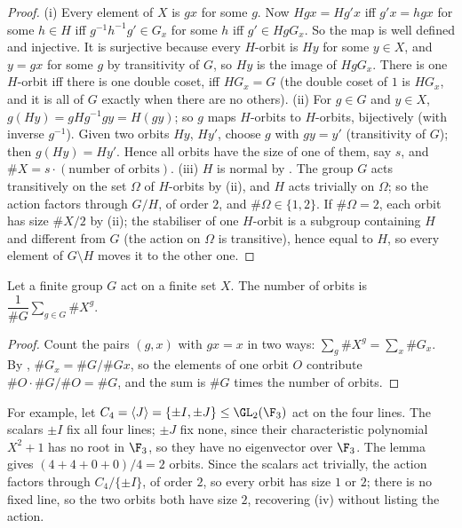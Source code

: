 \begin{proof}
(i) Every element of $X$ is $gx$ for some $g$. Now $Hgx=Hg'x$ iff $g'x=hgx$ for some $h\in H$ iff $g^{-1}h^{-1}g'\in G_x$ for some $h$ iff $g'\in HgG_x$. So the
map is well defined and injective. It is surjective because every $H$-orbit is $Hy$ for some $y\in X$, and $y=gx$ for some $g$ by transitivity of $G$,
so $Hy$ is the image of $HgG_x$. There is one $H$-orbit iff there is one double coset, iff $HG_x=G$ (the double coset of $1$ is $HG_x$, and it is all
of $G$ exactly when there are no others).
(ii) For $g\in G$ and $y\in X$, $g(Hy)=gHg^{-1}gy=H(gy)$; so $g$ maps $H$-orbits to $H$-orbits, bijectively (with inverse $g^{-1}$). Given two orbits
$Hy$, $Hy'$, choose $g$ with $gy=y'$ (transitivity of $G$); then $g(Hy)=Hy'$. Hence all orbits have the size of one of them, say $s$, and
$\#X=s\cdot(\text{number of orbits})$. (iii) $H$ is normal by . The group $G$ acts transitively on the set $\Omega$ of $H$-orbits by (ii),
and $H$ acts trivially on $\Omega$; so the action factors through $G/H$, of order $2$, and $\#\Omega\in\{1,2\}$. If $\#\Omega=2$, each orbit has size $\#X/2$ by
(ii); the stabiliser of one $H$-orbit is a subgroup containing $H$ and different from $G$ (the action on $\Omega$ is transitive), hence equal to $H$, so every
element of $G\setminus H$ moves it to the other one.
\end{proof}

\begin{lemma}\label{lem:groups:burnside}
Let a finite group $G$ act on a finite set $X$. The number of orbits is $\dfrac1{\#G}\displaystyle\sum_{g\in G}\#X^g$.
\end{lemma}

\begin{proof}
Count the pairs $(g,x)$ with $gx=x$ in two ways: $\sum_g\#X^g=\sum_x\#G_x$. By , $\#G_x=\#G/\#Gx$, so the elements of one
orbit $O$ contribute $\#O\cdot\#G/\#O=\#G$, and the sum is $\#G$ times the number of orbits.
\end{proof}

For example, let $C_4=\langle J\rangle=\{\pm I,\pm J\}\le\GL_2(\F_3)$ act on the four lines. The scalars $\pm I$ fix all four lines; $\pm J$ fix none, since
their characteristic polynomial $X^2+1$ has no root in $\F_3$, so they have no eigenvector over $\F_3$. The lemma gives $(4+4+0+0)/4=2$ orbits. Since the scalars act trivially,
the action factors through $C_4/\{\pm I\}$, of order $2$, so every orbit has size $1$ or $2$; there is no fixed line, so the two orbits both have size $2$, recovering
(iv) without listing the action.

